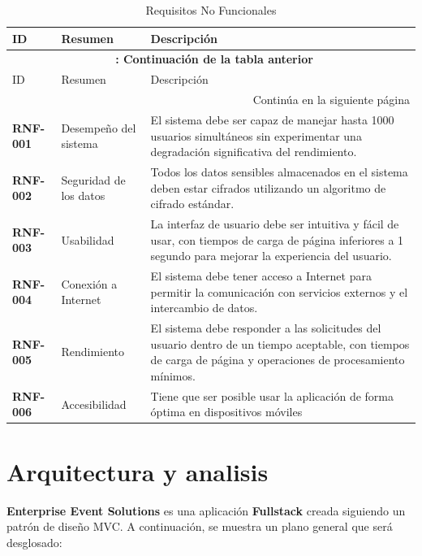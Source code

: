     \begin{longtable}{ p{2.5cm} p{4cm} p{9cm} }
        \caption{Requisitos No Funcionales} \label{tabla:RNF} \\
        \hline
        ID & Resumen & Descripción \\
        \hline
        \endfirsthead
        \multicolumn{3}{c}{{\bfseries \tablename\ \thetable{}: Continuación de la tabla anterior}} \\
        \hline
        ID & Resumen & Descripción \\
        \hline
        \endhead
        \hline \multicolumn{3}{|r|}{{Continúa en la siguiente página}} \\ \hline
        \endfoot
        \hline
        \endlastfoot
        \textbf{RNF-001} & Desempeño del sistema & El sistema debe ser capaz de manejar hasta 1000 usuarios simultáneos sin experimentar una degradación 
        significativa del rendimiento. \\
        \textbf{RNF-002} & Seguridad de los datos & Todos los datos sensibles almacenados en el sistema deben estar cifrados utilizando un algoritmo de cifrado 
        estándar. \\
        \textbf{RNF-003} & Usabilidad & La interfaz de usuario debe ser intuitiva y fácil de usar, con tiempos de carga de página inferiores a 1 segundo para 
        mejorar la experiencia del usuario. \\
        \textbf{RNF-004} &  Conexión a Internet & El sistema debe tener acceso a Internet para permitir la comunicación con servicios externos y el intercambio
         de datos. \\
        \textbf{RNF-005} & Rendimiento & El sistema debe responder a las solicitudes del usuario dentro de un tiempo aceptable, con tiempos de carga de página y
         operaciones de procesamiento mínimos. \\
        \textbf{RNF-006} & Accesibilidad & Tiene que ser posible usar la aplicación de forma óptima en dispositivos móviles\\ 
    \end{longtable}

\section{Arquitectura y analisis}

\textbf{Enterprise Event Solutions} es una aplicación \textbf{Fullstack} creada siguiendo un patrón de diseño MVC. A continuación, se muestra un plano general
que será desglosado:

